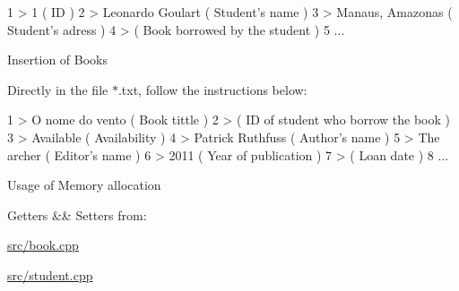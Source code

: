 \begin{DoxyCode}
1 > 1             ( ID ) 
2 > Leonardo Goulart  ( Student's name )
3 > Manaus, Amazonas  ( Student's adress )
4 >           ( Book borrowed by the student )
5 ...
\end{DoxyCode}



\begin{DoxyItemize}
\item Insertion of Books

Directly in the file $\ast$.txt, follow the instructions below\+:
\end{DoxyItemize}


\begin{DoxyCode}
1 > O nome do vento   ( Book tittle )
2 >           ( ID of student who borrow the book )
3 > Available         ( Availability )
4 > Patrick Ruthfuss  ( Author's name )
5 > The archer        ( Editor's name )
6 > 2011          ( Year of publication )
7 >           ( Loan date )
8 ... 
\end{DoxyCode}



\begin{DoxyItemize}
\item Usage of Memory allocation

Getters \&\& Setters from\+:

\hyperlink{book_8cpp}{src/book.\+cpp}

\hyperlink{student_8cpp}{src/student.\+cpp} 
\end{DoxyItemize}